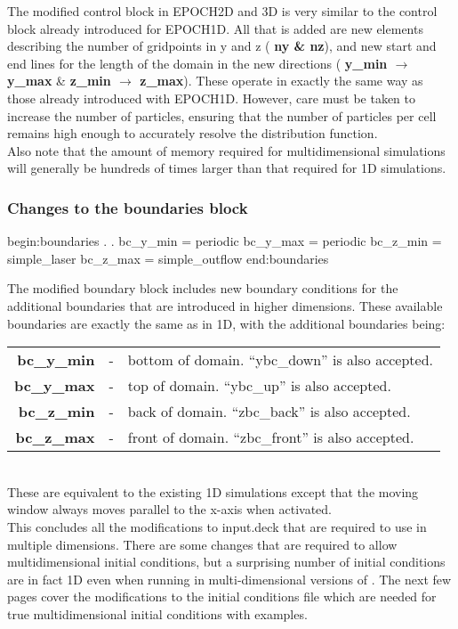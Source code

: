 \documentclass[12pt,a4paper]{article}
\newcommand{\inlineemph}[1]{{\color{warwicklight} \bf{#1}}}
\newcommand{\inlineemtt}{\color{warwicklight} \fontfamily{phv}\selectfont\ttfamily\bfseries}
\newcommand{\EPOCH}{{\color{warwickdark}\fontfamily{phv}\selectfont{EPOCH}}}
\newenvironment{lboxverbatim}[1]{
\setlength{\FrameSep}{0pt}
\def\FrameCommand{\fboxsep=0pt \colorbox{shadecolor}}
\MakeFramed{\FrameRestore}
\vspace{-13.5pt}
\fvset{label=#1}
\boxverb
}{
\endboxverb
\vspace{-13.5pt}
\endMakeFramed
}
\begin{document}
The modified control block in EPOCH2D and 3D is very similar to the control
block already introduced for EPOCH1D. All that is added are new elements
describing the number of gridpoints in y and z (\inlineemph{ny \& nz}), and
new start and end lines for the length of the domain in the new directions
(\inlineemph{y\_min $\rightarrow$ y\_max} \&
\inlineemph{z\_min $\rightarrow$ z\_max}). These operate in exactly the same
way as those already introduced with EPOCH1D.  However, care must be taken to
increase the number of particles, ensuring that the number of particles per
cell remains high enough to accurately resolve the distribution function.\\

Also note that the amount of memory required for multidimensional simulations
will generally be hundreds of times larger than that required for 1D
simulations.\\

\subsubsection{Changes to the \inlineemph{boundaries} block}

\begin{lboxverbatim}{Changed boundaries block}
begin:boundaries
   .
   .
   bc_y_min = periodic
   bc_y_max = periodic
   bc_z_min = simple_laser
   bc_z_max = simple_outflow
end:boundaries
\end{lboxverbatim}

The modified boundary block includes new boundary conditions for the additional
boundaries that are introduced in higher dimensions. These available boundaries
are exactly the same as in 1D, with the additional boundaries being:\\

\begin{tabular}{rcl}
{\inlineemtt bc\_y\_min} &-& bottom of domain. ``ybc\_down'' is also accepted.\\
{\inlineemtt bc\_y\_max} &-& top of domain. ``ybc\_up'' is also accepted.\\
{\inlineemtt bc\_z\_min} &-& back of domain. ``zbc\_back'' is also accepted.\\
{\inlineemtt bc\_z\_max} &-& front of domain. ``zbc\_front'' is also accepted.\\
\end{tabular} \\

These are equivalent to the existing 1D simulations except that the moving
window always moves parallel to the x-axis when activated.\\
This concludes all
the modifications to input.deck that are required to use {\EPOCH} in multiple
dimensions. There are some changes that are required to allow
multidimensional initial conditions, but a surprising number of initial
conditions are in fact 1D even when running in multi-dimensional versions of
{\EPOCH}. The next few pages cover the modifications to the initial conditions
file which are needed for true multidimensional initial conditions with
examples.
\end{document}
